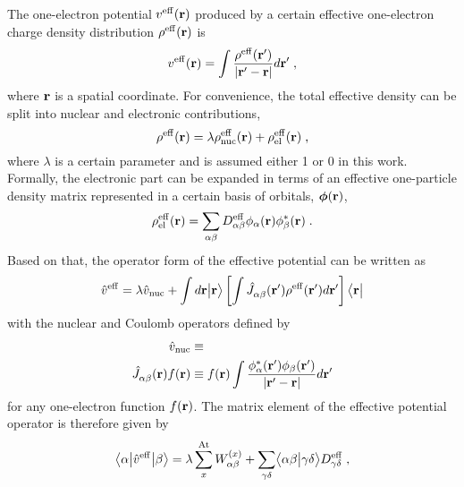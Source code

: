 The one\hyp{}electron potential $v^{\rm eff}({\bf r})$
produced by a certain effective one\hyp{}electron charge density distribution $\rho^{\rm eff}({\bf r})$
is 
%
\begin{equation} \label{e:v-eff}
	v^{\rm eff}({\bf r}) = \int \frac{ \rho^{\rm eff}({\bf r}') }{ \vert {\bf r}' - {\bf r} \vert} d{\bf r}' \;,
\end{equation}
%
where ${\bf r}$ is a spatial coordinate. 
For convenience, the total effective density can be split into nuclear and electronic contributions,
%
\begin{equation} \label{e:rho-eff}
 \rho^{\rm eff}({\bf r}) = \lambda \rho^{\rm eff}_{\rm nuc}({\bf r}) + \rho^{\rm eff}_{\rm el}({\bf r}) \;,
\end{equation}
%
where $\lambda$ is a certain parameter and is assumed either 1 or 0 in this work.
Formally, the electronic part can be expanded in terms of an effective
one\hyp{}particle density matrix represented in a certain basis of orbitals, $\BM{\phi}({\bf r})$,
%
\begin{equation} \label{e:d-spectral}
	\rho^{\rm eff}_{\rm el}({\bf r}) = \sum_{\alpha\beta} D_{\alpha\beta}^{\rm eff} 
	\phi_\alpha({\bf r}) \phi_\beta^{*}({\bf r})  \;.
\end{equation}
%
Based on that, the operator form of the effective potential 
can be written as
%
\begin{equation} \label{e:oep-operator}
	\hat{v}^{\rm eff} = 
        \lambda \hat{v}_{\rm nuc} +
        \int d{\bf r} \Ket{{\bf r}} 
	\left[
	\int
	\hat{J}^{\rm}_{\alpha\beta}({\bf r}') 
	\rho^{\rm eff}({\bf r}')
	d{\bf r}' 
	\right]
        \Bra{{\bf r}}
\end{equation}
%
with the nuclear
and Coulomb operators defined by
%
\begin{subequations}
\begin{align}
        \hat{v}_{\rm nuc} &\equiv \\
	\hat{J}^{\rm}_{\alpha\beta}({\bf r}) f({\bf r}) &\equiv
	f({\bf r}) 
	\int
	\frac{ \phi_\alpha^{*}({\bf r}') \phi_\beta({\bf r}') }{ \vert {\bf r}' - {\bf r} \vert} d{\bf r}'
\end{align}
\end{subequations}
%
for any one\hyp{}electron function $f({\bf r})$. The matrix element of the effective potential operator
is therefore given by
%
\begin{equation}
	\tBraKet{\alpha}{ \hat{v}^{\rm eff} }{\beta}
	= \lambda \sum_x^{\rm At} W_{\alpha\beta}^{(x)} +
        \sum_{\gamma\delta} \BraKet{\alpha\beta}{\gamma\delta} D^{\rm eff}_{\gamma\delta}  \;,
\end{equation}
